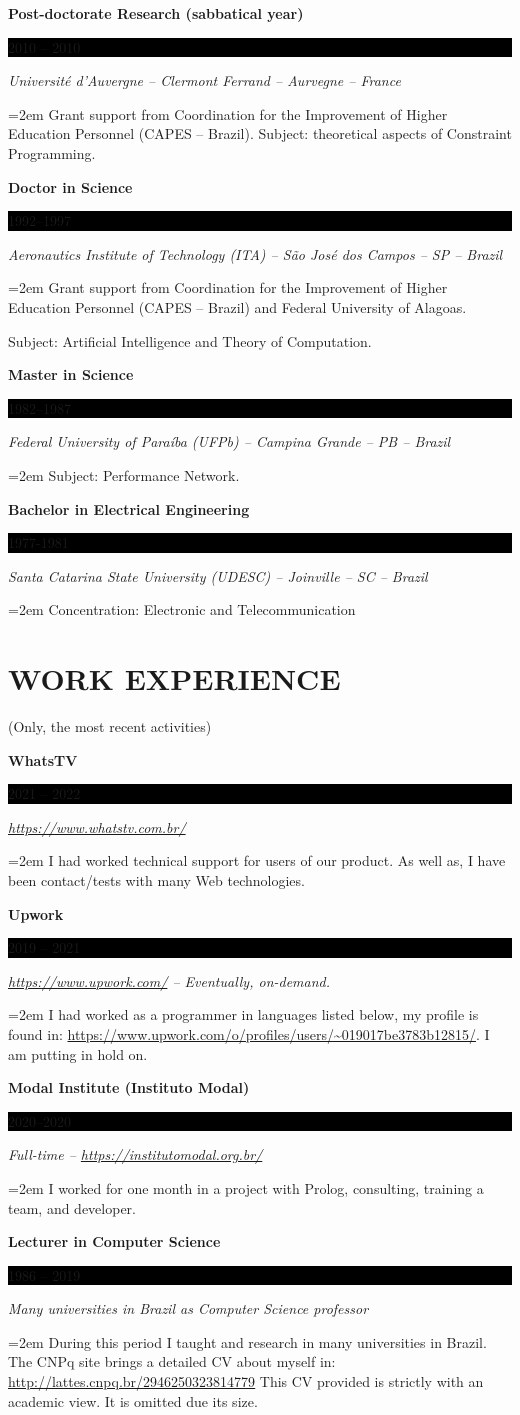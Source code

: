 \documentclass[paper=a4,fontsize=11pt]{scrartcl} %
\newcommand{\sepspace}{\vspace*{0.8em}}		%
\newcommand{\NewPart}[1]{\section*{\uppercase{#1}}}
\newcommand{\EducationEntry}[4]{
		\noindent \textbf{#1} \hfill      %
		\colorbox{Black}{%
			\parbox{6em}{%
			\hfill\color{White}#2}} \par  %
		\noindent \textit{#3} \par        %
		\noindent\hangindent=2em\hangafter=0 \small #4 %
		\normalsize \par}
\begin{document}
\EducationEntry{Post-doctorate Research (sabbatical year)}{2010 -- 2010}{Université d'Auvergne -- Clermont Ferrand -- Aurvegne -- France}{Grant support from  Coordination for the Improvement of Higher Education Personnel (CAPES -- Brazil). Subject: theoretical aspects of Constraint Programming.}
\sepspace

\EducationEntry{Doctor in Science}{1992--1997}{Aeronautics Institute of Technology (ITA) -- São José dos Campos -- SP -- Brazil}{Grant support from  Coordination for the Improvement of Higher Education Personnel (CAPES -- Brazil) and Federal University of Alagoas.} {Subject: Artificial Intelligence and Theory of Computation.}
\sepspace

\EducationEntry{Master in Science}{1982--1987}{Federal University of Paraíba (UFPb) -- Campina Grande -- PB -- Brazil}{Subject: Performance Network.}
\sepspace

\EducationEntry{Bachelor in Electrical Engineering}{1977-1981}{Santa Catarina State University (UDESC) -- Joinville -- SC -- Brazil}{Concentration: Electronic and Telecommunication}
\NewPart{Work experience}(Only, the most recent activities)%

\EducationEntry{WhatsTV} {2021 -- 2022}{\url{https://www.whatstv.com.br/}}{I had worked technical support for users of our product. As well as, I have been contact/tests with many Web technologies.}
\sepspace

\EducationEntry{Upwork} {2019 -- 2021}{\url{https://www.upwork.com/} -- Eventually,  on-demand.}{I had worked as a programmer in languages listed below, my profile is found in: \url{https://www.upwork.com/o/profiles/users/~019017be3783b12815/}. I am putting in hold on.}
\sepspace

\EducationEntry{Modal Institute (Instituto Modal)} {2020--2020}{Full-time -- \url{https://institutomodal.org.br/}}
{I worked for one month in a project with Prolog, consulting, training a team, and developer.}
\sepspace

\EducationEntry{Lecturer in Computer Science} {1986 -- 2019}{Many universities in Brazil as Computer Science professor}{During this period I taught and research in many universities in Brazil. The CNPq site brings a detailed CV about myself in: \underline{\url{http://lattes.cnpq.br/2946250323814779}}  This CV provided is strictly with an academic view. It is omitted due its size.}
\end{document}
